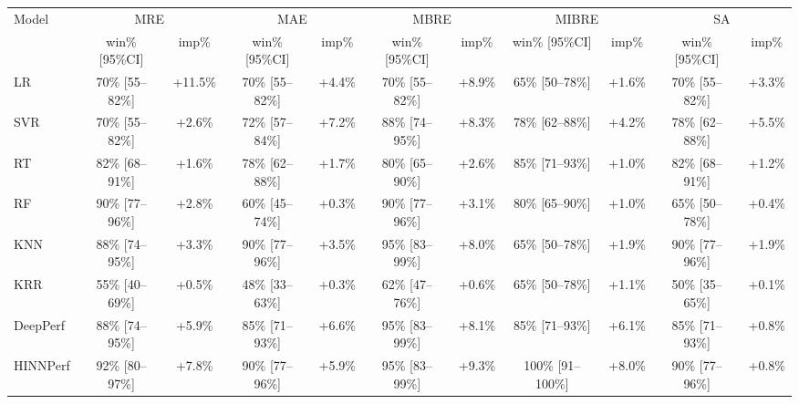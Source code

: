 \begin{tabular}{lcccccccccc}
\toprule
Model & \multicolumn{2}{c}{MRE} & \multicolumn{2}{c}{MAE} & \multicolumn{2}{c}{MBRE} & \multicolumn{2}{c}{MIBRE} & \multicolumn{2}{c}{SA} \\
& win\% [95\%CI] & imp\% & win\% [95\%CI] & imp\% & win\% [95\%CI] & imp\% & win\% [95\%CI] & imp\% & win\% [95\%CI] & imp\% \\
\midrule
LR & 70\% [55--82\%] & +11.5\% & 70\% [55--82\%] & +4.4\% & 70\% [55--82\%] & +8.9\% & 65\% [50--78\%] & +1.6\% & 70\% [55--82\%] & +3.3\% \\
SVR & 70\% [55--82\%] & +2.6\% & 72\% [57--84\%] & +7.2\% & 88\% [74--95\%] & +8.3\% & 78\% [62--88\%] & +4.2\% & 78\% [62--88\%] & +5.5\% \\
RT & 82\% [68--91\%] & +1.6\% & 78\% [62--88\%] & +1.7\% & 80\% [65--90\%] & +2.6\% & 85\% [71--93\%] & +1.0\% & 82\% [68--91\%] & +1.2\% \\
RF & 90\% [77--96\%] & +2.8\% & 60\% [45--74\%] & +0.3\% & 90\% [77--96\%] & +3.1\% & 80\% [65--90\%] & +1.0\% & 65\% [50--78\%] & +0.4\% \\
KNN & 88\% [74--95\%] & +3.3\% & 90\% [77--96\%] & +3.5\% & 95\% [83--99\%] & +8.0\% & 65\% [50--78\%] & +1.9\% & 90\% [77--96\%] & +1.9\% \\
KRR & 55\% [40--69\%] & +0.5\% & 48\% [33--63\%] & +0.3\% & 62\% [47--76\%] & +0.6\% & 65\% [50--78\%] & +1.1\% & 50\% [35--65\%] & +0.1\% \\
DeepPerf & 88\% [74--95\%] & +5.9\% & 85\% [71--93\%] & +6.6\% & 95\% [83--99\%] & +8.1\% & 85\% [71--93\%] & +6.1\% & 85\% [71--93\%] & +0.8\% \\
HINNPerf & 92\% [80--97\%] & +7.8\% & 90\% [77--96\%] & +5.9\% & 95\% [83--99\%] & +9.3\% & 100\% [91--100\%] & +8.0\% & 90\% [77--96\%] & +0.8\% \\
\bottomrule
\end{tabular}
